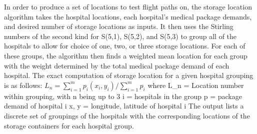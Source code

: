 

	In order to produce a set of locations to test flight paths on, the storage location algorithm takes the hospital locations, each hospital's medical package demands, and desired number of storage locations as inputs. It then uses the Stirling numbers of the second kind for S(5,1), S(5,2), and S(5,3) to group all of the hospitals to allow for choice of one, two, or three storage locations. For each of these groups, the algorithm then finds a weighted mean location for each group with the weight determined by the total medical package demand of each hospital.  The exact computation of storage location for a given hospital grouping is as follows:
	$ L_n = \sum_{i=1}^{m} p_i(x_i, y_i) / \sum_{i=1}^{m} p_i $
	where L_n = Location number within grouping, with n being up to 3
		i = hospitals in the group
		p = package demand of hospital i
		x, y = longitude, latitude of hospital i
The output lists a discrete set of groupings of the hospitals with the corresponding locations of the storage containers for each hospital group.	